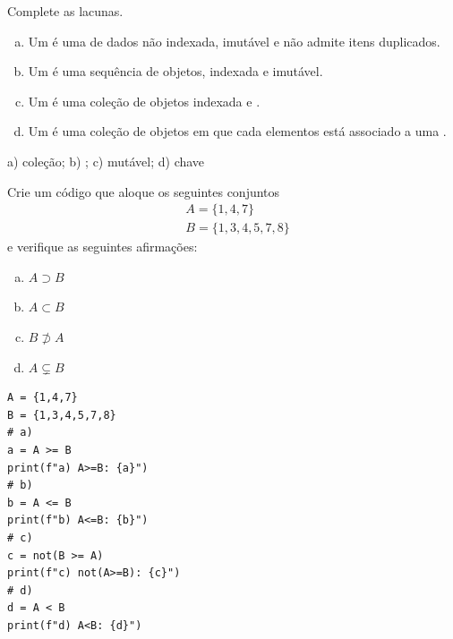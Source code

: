 \begin{exer}
  Complete as lacunas.
  \begin{enumerate}[a)]
    \item Um {\PYTHONset} é uma \underline{\phantom{coleção}} de dados não indexada, imutável e não admite itens duplicados.
    \item Um \underline{\phantom{{\PYTHONtuple}}} é uma sequência de objetos, indexada e imutável.
    \item Um {\PYTHONlist} é uma coleção de objetos indexada e \underline{\phantom{mutável}}.
    \item Um {\PYTHONdict} é uma coleção de objetos em que cada elementos está associado a uma \underline{\phantom{chave}}.
  \end{enumerate}
\end{exer}
\begin{resp}
  a) coleção; b) {\PYTHONtuple}; c) mutável; d) chave
\end{resp}


\begin{exer}
  Crie um código que aloque os seguintes conjuntos
  \begin{align}
    & A = \{1,4,7\} \\
    & B = \{1,3,4,5,7,8\}
  \end{align}
  e verifique as seguintes afirmações:
  \begin{enumerate}[a)]
  \item $A\supset B$
  \item $A\subset B$
  \item $B\not\supset A$
  \item $A\subsetneq B$
  \end{enumerate}
\end{exer}
\begin{resp}

\begin{lstlisting}
A = {1,4,7}
B = {1,3,4,5,7,8}
# a)
a = A >= B
print(f"a) A>=B: {a}")
# b)
b = A <= B
print(f"b) A<=B: {b}")
# c)
c = not(B >= A)
print(f"c) not(A>=B): {c}")
# d)
d = A < B
print(f"d) A<B: {d}")
\end{lstlisting}

\end{resp}

